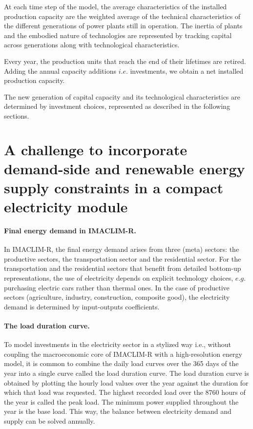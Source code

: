 At each time step of the model, the average characteristics of the installed production capacity are the weighted average of the technical characteristics of the different generations of power plants still in operation.
The inertia of plants and the embodied nature of technologies are represented by tracking capital across generations along with technological characteristics.


Every year, the production units that reach the end of their lifetimes are retired.
Adding the annual capacity additions $i.e.$ investments, we obtain a net installed production capacity.

The new generation of capital capacity and its technological characteristics are determined by investment choices, represented as described in the following sections.

\section{A challenge to incorporate demand-side and renewable energy supply constraints in a compact electricity module}

\paragraph{Final energy demand in IMACLIM-R.}

In IMACLIM-R, the final energy demand arises from three (meta) sectors: the productive sectors, the transportation sector and the residential sector. For the transportation and the residential sectors that benefit from detailed bottom-up representations, the use of electricity depends on explicit technology choices, $e.g.$ purchasing electric cars rather than thermal ones. In the case of productive sectors (agriculture, industry, construction, composite good), the electricity demand is determined by input-outputs coefficients.

\paragraph{The load duration curve.}

To model investments in the electricity sector in a stylized way i.e., without coupling the macroeconomic core of IMACLIM-R with a high-resolution energy model, it is common to combine the daily load curves over the 365 days of the year into a single curve called the load duration curve.
The load duration curve is obtained by plotting the hourly load values over the year against the duration for which that load was requested. The highest recorded load over the 8760 hours of the year is called the peak load. The minimum power supplied throughout the year is the base load. This way, the balance between electricity demand and supply can be solved annually.


